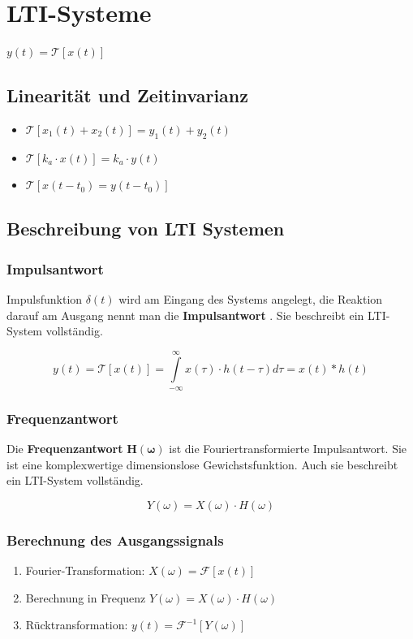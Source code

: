 \section{LTI-Systeme}

$ y(t) = \mathcal{T}[x(t)]$

\begin{multicols}{2}
    \subsection*{Linearität und Zeitinvarianz}
    \begin{itemize}
        \item $\mathcal{T}[x_1(t) + x_2(t)] = y_1(t) + y_2(t)$
        \item $\mathcal{T}[k_a \cdot x(t)] = k_a \cdot y(t)$
        \item $\mathcal{T}[x(t-t_0) = y(t-t_0)]$
    \end{itemize}

    \subsection{Beschreibung von LTI Systemen}

    \subsubsection{Impulsantwort}
    Impulsfunktion $\delta(t)$ wird am Eingang des Systems angelegt,
    die Reaktion darauf am Ausgang nennt man die \textbf{Impulsantwort} .
    Sie beschreibt ein LTI-System vollständig.

    $$ y(t) = \mathcal{T}[x(t)]
        = \int \limits _{-\infty} ^{\infty} x(\tau) \cdot h(t-\tau)d\tau
        = x(t) * h(t)$$
  
    \subsubsection{Frequenzantwort}
    Die \textbf{Frequenzantwort} $\bm{H(\omega)}$ ist die Fouriertransformierte Impulsantwort.
    Sie ist eine komplexwertige dimensionslose Gewichstsfunktion.
    Auch sie beschreibt ein LTI-System vollständig.

    $$ Y(\omega) = X(\omega) \cdot H(\omega)$$

    \subsubsection{Berechnung des Ausgangssignals}
\begin{enumerate}
   \item Fourier-Transformation:  $X(\omega) = \mathcal{F}[x(t)]$ 
   \item Berechnung in Frequenz  $Y(\omega) = X(\omega) \cdot H(\omega)$ 
   \item Rücktransformation:  $y(t) = \mathcal{F}^{-1}[Y(\omega)]$ 
\end{enumerate}



\end{multicols}
